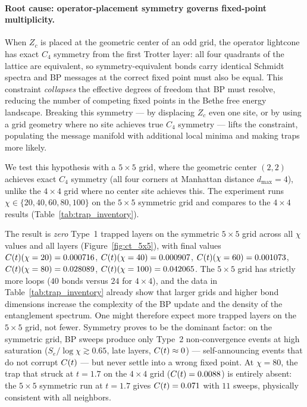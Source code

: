 \paragraph{Root cause: operator-placement symmetry governs fixed-point multiplicity.}
When $Z_c$ is placed at the geometric center of an odd grid, the operator
lightcone has exact $C_4$ symmetry from the first Trotter layer: all four
quadrants of the lattice are equivalent, so symmetry-equivalent bonds carry
identical Schmidt spectra and BP messages at the correct fixed point must also
be equal.
This constraint \emph{collapses} the effective degrees of freedom that BP must
resolve, reducing the number of competing fixed points in the Bethe free energy
landscape.
Breaking this symmetry --- by displacing $Z_c$ even one site, or by using a
grid geometry where no site achieves true $C_4$ symmetry --- lifts the
constraint, populating the message manifold with additional local minima and
making traps more likely.

We test this hypothesis with a $5\times5$ grid, where the geometric center
$(2,2)$ achieves exact $C_4$ symmetry (all four corners at Manhattan distance
$d_{\max}=4$), unlike the $4\times4$ grid where no center site achieves this.
The experiment runs $\chi \in \{20, 40, 60, 80, 100\}$ on the $5\times5$
symmetric grid and compares to the $4\times4$ results (Table~\ref{tab:trap_inventory}).

The result is \emph{zero} Type~1 trapped layers on the symmetric $5\times5$ grid
across all $\chi$ values and all layers (Figure~\ref{fig:ct_5x5}),
with final values $C(t)(\chi=20)=0.000716$, $C(t)(\chi=40)=0.000907$,
$C(t)(\chi=60)=0.001073$, $C(t)(\chi=80)=0.028089$, $C(t)(\chi=100)=0.042065$.
The $5\times5$ grid has strictly more loops ($40$ bonds versus $24$ for $4\times4$),
and the data in Table~\ref{tab:trap_inventory} already show
that larger grids and higher bond dimensions increase the complexity of the BP
update and the density of the entanglement spectrum.
One might therefore expect more trapped layers on the $5\times5$ grid, not
fewer.
Symmetry proves to be the dominant factor: on the symmetric grid, BP sweeps
produce only Type~2 non-convergence events at high saturation
($S_e/\log\chi \gtrsim 0.65$, late layers, $C(t) \approx 0$) --- self-announcing
events that do not corrupt $C(t)$ --- but never settle into a wrong fixed point.
At $\chi=80$, the trap that struck at $t=1.7$ on the $4\times4$ grid
($C(t)=0.0088$) is entirely absent: the $5\times5$ symmetric run at $t=1.7$
gives $C(t)=0.071$ with $11$ sweeps, physically consistent with all neighbors.

